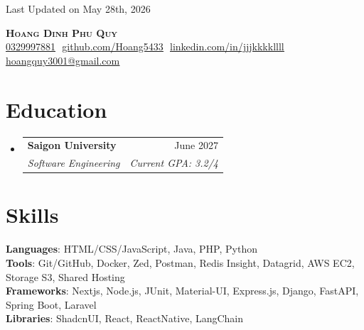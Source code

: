\documentclass[letterpaper,11pt]{article}
\makeatletter
\newcommand{\resumeSubheading}[4]{
  \vspace{-2pt}\item
    \begin{tabular*}{0.97\textwidth}[t]{l@{\extracolsep{\fill}}r}
      \textbf{#1} & #2 \\
      \textit{\small#3} & \textit{\small #4} \\
    \end{tabular*}\vspace{-7pt}
}
\newcommand{\resumeSubHeadingListStart}{\begin{itemize}[leftmargin=0.15in, label={}]}
\newcommand{\resumeSubHeadingListEnd}{\end{itemize}}
\makeatother
\begin{document}
\begin{flushright}
  \color{gray}
  \item
  Last Updated on May 28th, 2026
\end{flushright}

\vspace{-5pt}

\begin{center}
    \textbf{\Huge \scshape Hoang Dinh Phu Quy} \\ \vspace{8pt}
    \small 
    \href{tel:+84329997881}{\underline{0329997881}} $  $
    \href{https://github.com/Hoang5433}{\underline{github.com/Hoang5433}} $  $
    \href{https://www.linkedin.com/in/jjjkkkkllll/}{\underline{linkedin.com/in/jjjkkkkllll}} $  $
    \href{mailto:hoangquy3001@gmail.com}
    {\underline{hoangquy3001@gmail.com}}
\end{center}

\section{Education}
  \resumeSubHeadingListStart
  
    \resumeSubheading
      {Saigon University}{June 2027}
      {Software Engineering}{Current GPA: 3.2/4}

  \resumeSubHeadingListEnd

\section{Skills}
 \begin{itemize}[leftmargin=0.15in, label={}]
    \small{\item{
    
     \textbf{Languages}{: HTML/CSS/JavaScript, Java, PHP, Python } \\
     
     \textbf{Tools}{: Git/GitHub, Docker, Zed, Postman, Redis Insight, Datagrid, AWS EC2, Storage S3, Shared Hosting } \\
     
     \textbf{Frameworks}{: Nextjs, Node.js, JUnit, Material-UI, Express.js, Django, FastAPI, Spring Boot, Laravel } \\
     
     \textbf{Libraries}{: ShadcnUI, React, ReactNative, LangChain }
     
    }}
 \end{itemize}
\end{document}
